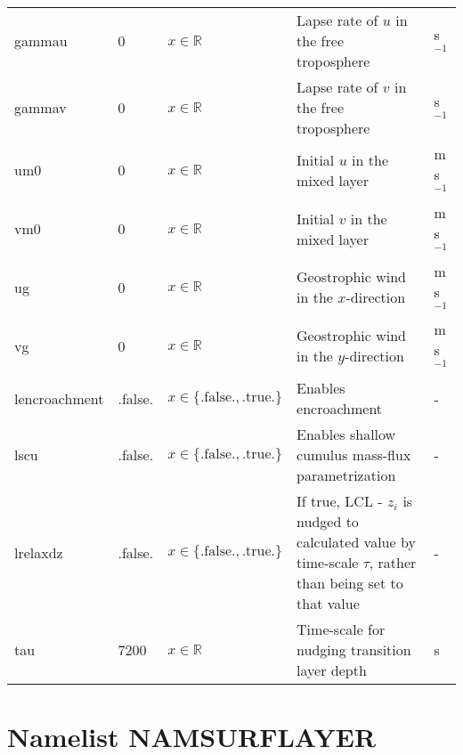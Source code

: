 \documentclass[twoside,11pt,fleqn,a4paper,english,openright]{report}
\begin{document}
\begin{center}
\begin{supertabular}{|l|p{1.2cm}|p{3.4cm}|p{5cm}|l|}
gammau	&	0			& $x \in \mathbb{R}$								&	Lapse rate of $u$ in the free troposphere	& s$^{-1}$\\
gammav	&	0			& $x \in \mathbb{R}$								&	Lapse rate of $v$ in the free troposphere	& s$^{-1}$\\
um0		&	0				&	$x \in \mathbb{R}$								&	Initial $u$ in the mixed layer	& m s$^{-1}$\\
vm0		&	0				&	$x \in \mathbb{R}$								&	Initial $v$ in the mixed layer	& m s$^{-1}$\\
ug		&	0				&	$x \in \mathbb{R}$								&	Geostrophic wind in the $x$-direction	& m s$^{-1}$\\
vg		&	0				&	$x \in \mathbb{R}$								&	Geostrophic wind in the $y$-direction	& m s$^{-1}$\\
lencroachment & .false.	&	$x\in\{\text{.false.},\text{.true.}\}$	& Enables encroachment	& -\\
lscu & .false.	&	$x\in\{\text{.false.},\text{.true.}\}$	& Enables shallow cumulus mass-flux parametrization	& -\\
lrelaxdz & .false.	&	$x\in\{\text{.false.},\text{.true.}\}$	& If true, LCL - $z_i$ is nudged to calculated value by time-scale $\tau$, rather than being set to that value	& -\\
tau & 7200 & $x \in \mathbb{R}$	& Time-scale for nudging transition layer depth	& s\\
\end{supertabular}
\end{center}
\newpage
\section{Namelist NAMSURFLAYER}\label{par:namsl}
\end{document}
